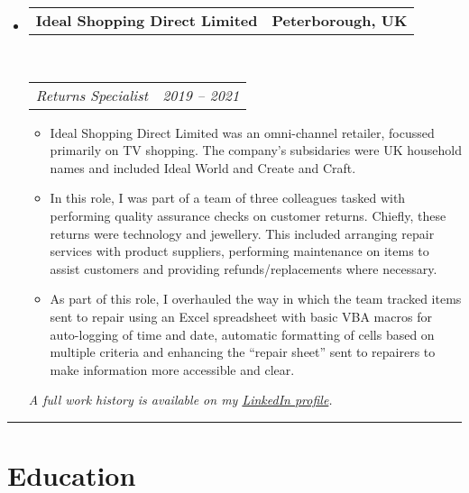 \documentclass[10pt,a4paper]{article}
\makeatletter
\newcommand{\headerrow}[2]
{\begin{tabular*}{\linewidth}{l@{\extracolsep{\fill}}r}
	#1 &
	#2 \\
\end{tabular*}}
\makeatother
\begin{document}
\begin{itemize}
	\item
	\headerrow
		{\textbf{Ideal Shopping Direct Limited}}
		{\textbf{Peterborough, UK}}
	\\
	\headerrow
		{\emph{Returns Specialist}}
		{\emph{2019 -- 2021}}
	\begin{itemize}
        \item Ideal Shopping Direct Limited was an omni-channel retailer, focussed primarily on TV shopping. The company's subsidaries were UK household names and included Ideal World and Create and Craft.
		\item In this role, I was part of a team of three colleagues tasked with performing quality assurance checks on customer returns. Chiefly, these returns were technology and jewellery. This included arranging repair services with product suppliers, performing maintenance on items to assist customers and providing refunds/replacements where necessary.
		\item As part of this role, I overhauled the way in which the team tracked items sent to repair using an Excel spreadsheet with basic VBA macros for auto-logging of time and date, automatic formatting of cells based on multiple criteria and enhancing the ``repair sheet'' sent to repairers to make information more accessible and clear.
	\end{itemize}

	\begin{center}
		\color{gray}\small\emph{A full work history is available on my \href{https://linkedin.com/in/artydh}{LinkedIn profile}.}
	\end{center}
\end{itemize}
\vspace{-0.5em}
\hrule
\vspace{1.75em}
\section*{Education}
\end{document}
